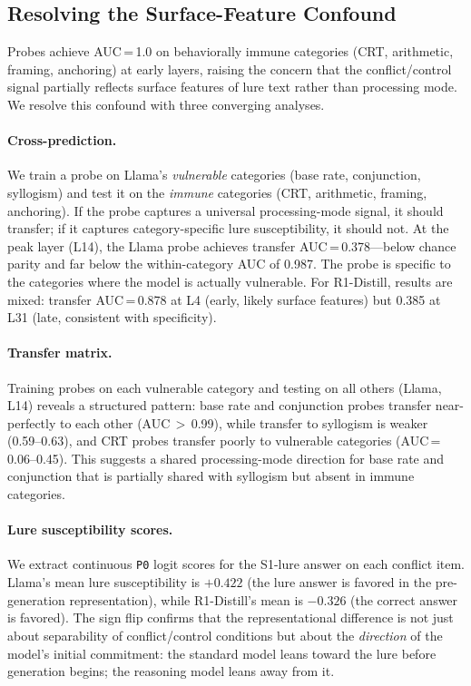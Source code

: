 \documentclass[accepted]{article}
\newcommand{\pzero}{\texttt{P0}}
\begin{document}
\subsection{Resolving the Surface-Feature Confound}
\label{sec:specificity}

Probes achieve AUC\,=\,1.0 on behaviorally immune categories (CRT,
arithmetic, framing, anchoring) at early layers, raising the concern
that the conflict/control signal partially reflects surface features of
lure text rather than processing mode.  We resolve this confound with
three converging analyses.

\paragraph{Cross-prediction.}
We train a probe on Llama's \emph{vulnerable} categories (base rate,
conjunction, syllogism) and test it on the \emph{immune} categories
(CRT, arithmetic, framing, anchoring).  If the probe captures a
universal processing-mode signal, it should transfer; if it captures
category-specific lure susceptibility, it should not.  At the peak layer
(L14), the Llama probe achieves transfer AUC\,=\,0.378---below chance
parity and far below the within-category AUC of 0.987.  The probe is
specific to the categories where the model is actually vulnerable.  For
R1-Distill, results are mixed: transfer AUC\,=\,0.878 at L4 (early,
likely surface features) but 0.385 at L31 (late, consistent with
specificity).

\paragraph{Transfer matrix.}
Training probes on each vulnerable category and testing on all others
(Llama, L14) reveals a structured pattern: base rate and conjunction
probes transfer near-perfectly to each other (AUC\,$>$\,0.99), while
transfer to syllogism is weaker (0.59--0.63), and CRT probes transfer
poorly to vulnerable categories (AUC\,=\,0.06--0.45).  This suggests a
shared processing-mode direction for base rate and conjunction that is
partially shared with syllogism but absent in
immune categories.

\paragraph{Lure susceptibility scores.}
We extract continuous \pzero{} logit scores for the S1-lure answer on
each conflict item.  Llama's mean lure susceptibility is $+0.422$
(the lure answer is favored in the pre-generation representation),
while R1-Distill's mean is $-0.326$ (the correct answer is favored).
The sign flip confirms that the representational difference is not just
about separability of conflict/control conditions but about the
\emph{direction} of the model's initial commitment: the standard model
leans toward the lure before generation begins; the reasoning model leans
away from it.
\end{document}

